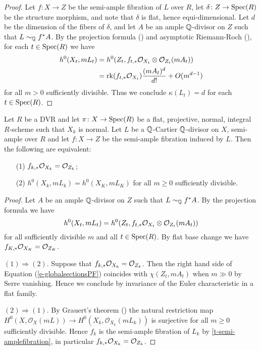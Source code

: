 	\begin{proof}
	Let $f\colon X \to Z$ be the semi-ample fibration of $L$ over $R$, let $\delta\colon Z\to\operatorname{Spec}(R)$ be the structure morphism, and note that $\delta$ is flat, hence equi-dimensional. Let $d$ be the dimension of the fibers of $\delta$, and let $A$ be an ample $\mathbb{Q}$-divisor on $Z$ such that $L\sim_{\mathbb{Q}}f^\ast A$. By the projection formula (\cite[\href{https://stacks.math.columbia.edu/tag/01E8}{Tag 01E8}]{stacks-project})  and asymptotic Riemann-Roch (\cite[Theorem VI.2.15]{k-rat-curves}), for each $t \in \operatorname{Spec}(R)$ we have
	\begin{equation*}
	\begin{split}
	h^0(X_t,mL_t)&=h^0(Z_t,f_{t,*} \mathcal{O}_{X_t}\otimes\mathcal{O}_{Z_t}(mA_t))\\
	&=\mathrm{rk} (f_{t,*} \mathcal{O}_{X_t})\frac{(mA_t)^d}{d!}+O(m^{d-1})
	\end{split}
	\end{equation*}
	for all $m> 0$ sufficiently divisible. Thus we conclude $\kappa(L_t)=d$ for each $t \in \operatorname{Spec}(R)$.
	\end{proof}
	
	
	\begin{lemma}\label{l-stein-invariance}
	Let $R$ be a DVR and let $\pi \colon X \to \operatorname{Spec}(R)$ be a flat, projective, normal, integral $R$-scheme such that $X_k$ is normal. 
	Let $L$ be a $\mathbb{Q}$-Cartier $\mathbb{Q}$-divisor on $X$, semi-ample over $R$ and let $f \colon X \to Z$ be the semi-ample fibration induced by $L$.
	Then the following are equivalent:
	\begin{enumerate}
		\item[(1)] $f_{k,*} \mathcal{O}_{X_k} = \mathcal{O}_{Z_k}$;
		\item[(2)] $h^0(X_k, mL_k)=h^0(X_K, mL_K)$ for all $m\geq 0$ sufficiently divisible.
	\end{enumerate}
\end{lemma}

\begin{proof}
	Let $A$ be an ample $\mathbb{Q}$-divisor on $Z$ such that $L \sim_{\mathbb{Q}}f^*A$. 
	By the projection formula we have 
	\begin{equation}\label{e-globalsectionsPF}
	h^0(X_t,mL_t)=h^0(Z_t,f_{t,\ast}\mathcal{O}_{X_t}\otimes\mathcal{O}_{Z_t}(mA_t))
	\end{equation}
	for all sufficiently divisible $m$ and all $t\in \operatorname{Spec} (R)$. By flat base change we have $f_{K,\ast}\mathcal{O}_{X_K}=\mathcal{O}_{Z_K}$.
	
	$(1) \Rightarrow (2)$. Suppose that $f_{k,\ast}\mathcal{O}_{X_k}=\mathcal{O}_{Z_k}$. Then the right hand side of Equation (\ref{e-globalsectionsPF}) coincides with $\chi(Z_t,mA_t)$ when $m\gg 0$ by Serre vanishing. Hence we conclude by invariance of the Euler characteristic in a flat family.
	
	$(2) \Rightarrow (1)$. By Grauert's theorem (\cite[Corollary III.12.9]{Ha77}) the natural restriction map
	$H^0(X,\mathcal{O}_X(mL))\to H^0(X_k,\mathcal{O}_{X_k}(mL_k))$
	is surjective for all $m \geq 0$ sufficiently divisible. Hence $f_k$ is the semi-ample fibration of $L_k$ by \autoref{t-semi-amplefibration}, in particular $f_{k,\ast}\mathcal{O}_{X_k}=\mathcal{O}_{Z_k}$. 
\end{proof}
	
